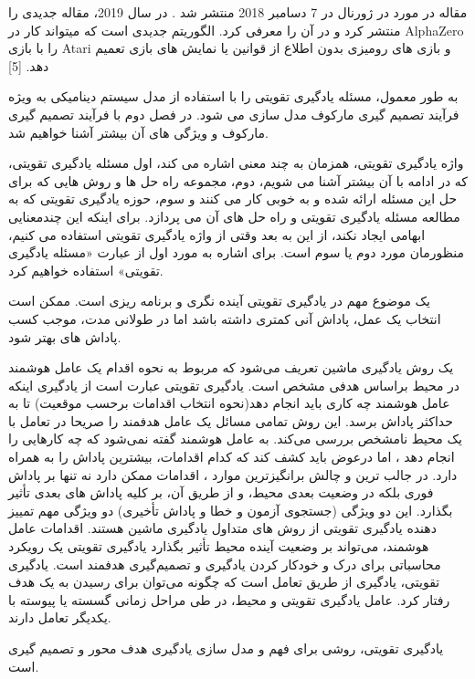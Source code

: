 مقاله
  در مورد
    در ژورنال
در 7 دسامبر 2018 منتشر شد
\cite{silver2018general}.
در سال 2019،
مقاله جدیدی را منتشر کرد و در آن
را معرفی کرد. 
الگوریتم جدیدی است که می\nf تواند کار در AlphaZero را با بازی Atari و بازی های رومیزی بدون اطلاع از قوانین یا نمایش های بازی تعمیم دهد. [5]


به طور معمول، مسئله یادگیری تقویتی را با استفاده از مدل سیستم دینامیکی به ویژه فرآیند تصمیم گیری مارکوف مدل سازی می شود. در فصل دوم با فرآیند تصمیم گیری مارکوف و ویژگی های آن بیشتر آشنا خواهیم شد.

واژه یادگیری تقویتی، همزمان به چند معنی اشاره می کند، اول مسئله یادگیری تقویتی، که در ادامه با آن بیشتر آشنا می شویم،  دوم، مجموعه راه حل ها و روش هایی که برای حل این مسئله ارائه شده و به خوبی کار می کنند و سوم، حوزه یادگیری تقویتی که به مطالعه مسئله یادگیری تقویتی و راه حل های آن می پردازد. برای اینکه این چندمعنایی ابهامی ایجاد نکند، از این به بعد وقتی از واژه یادگیری تقویتی استفاده می کنیم، منظورمان  مورد دوم یا سوم است. برای اشاره به مورد اول از عبارت «مسئله یادگیری تقویتی» استفاده خواهیم کرد. 

یک موضوع مهم در یادگیری تقویتی آینده نگری و برنامه ریزی است. ممکن است انتخاب یک عمل، پاداش آنی کمتری داشته باشد اما در طولانی مدت، موجب کسب پاداش های بهتر شود. 

یک روش یادگیری ماشین تعریف می‌شود که مربوط به نحوه اقدام یک عامل هوشمند  در محیط براساس هدفی مشخص است. یادگیری تقویتی عبارت است از یادگیری اینکه عامل هوشمند چه کاری باید انجام دهد(نحوه انتخاب اقدامات برحسب موقعیت) تا به حداکثر پاداش برسد. این روش تمامی‌ مسائل یک عامل هدفمند را صریحا در تعامل با یک محیط نامشخص بررسی می‌کند. به عامل هوشمند گفته نمی‌شود که چه کارهایی را انجام دهد ، اما درعوض باید کشف کند که کدام اقدامات، بیشترین پاداش را به همراه دارد. در جالب ترین و چالش برانگیزترین موارد ، اقدامات ممکن دارد نه تنها بر پاداش فوری بلکه در وضعیت بعدی محیط، و از طریق آن، بر کلیه پاداش های بعدی تأثیر بگذارد. این دو ویژگی (جستجوی آزمون و خطا و پاداش تأخیری) دو ویژگی مهم تمییز دهنده یادگیری تقویتی از روش های متداول یادگیری ماشین هستند.
اقدامات عامل هوشمند، می‌تواند بر وضعیت آینده محیط تأثیر بگذارد
یادگیری تقویتی یک رویکرد محاسباتی برای درک و خودکار کردن یادگیری و تصمیم‌گیری هدفمند است.
یادگیری تقویتی، یادگیری از  طریق تعامل است که چگونه می‌توان برای رسیدن به یک هدف رفتار کرد.
عامل یادگیری تقویتی و محیط، در طی مراحل زمانی گسسته یا پیوسته با یکدیگر تعامل دارند.

یادگیری تقویتی، روشی برای فهم و مدل سازی یادگیری هدف محور و تصمیم گیری است.



